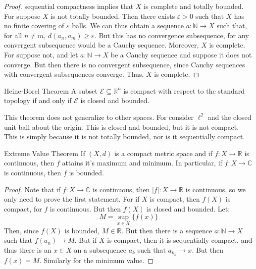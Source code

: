 \documentclass[crop=false,class=book,oneside]{standalone}
\begin{document}
\begin{proof}
                sequential compactness implies that $X$ is
                complete and totally bounded. For suppose $X$ is
                not totally bounded. Then there exists
                $\varepsilon>0$ such that $X$ has no finite
                covering of $\varepsilon$ balls. We can thus
                obtain a sequence $a:\mathbb{N}\rightarrow{X}$
                such that, for all $n\ne{m}$,
                $d(a_{n},a_{m})\geq\varepsilon$. But this
                has no convergence subsequence, for any convergent
                subsequence would be a Cauchy sequence. Moreover,
                $X$ is complete. For suppose not, and let
                $a:\mathbb{N}\rightarrow{X}$ be a Cauchy sequence
                and suppose it does not converge. But then there
                is no convergent subsequence, since Cauchy
                sequences with convergent subsequences converge.
                Thus, $X$ is complete.
            \end{proof}
            \begin{ltheorem}{Heine-Borel Theorem}
                A subset $\mathcal{E}\subseteq\mathbb{R}^{n}$ is
                compact with respect to the standard topology if and
                only if $\mathcal{E}$ is closed and bounded.
            \end{ltheorem}
            This theorem does not generalize to other spaces. For
            consider $\ell^{2}$ and the closed unit ball about the
            origin. This is closed and bounded, but it is not
            compact. This is simply because it is not totally
            bounded, nor is it sequentially compact.
            \begin{ltheorem}{Extreme Value Theorem}
                If $(X,d)$ is a compact metric space and if
                $f:X\rightarrow\mathbb{R}$ is continuous, then
                $f$ attains it's maximum and minimum. In particular,
                if $f:X\rightarrow\mathbb{C}$ is continuous, then
                $f$ is bounded.
            \end{ltheorem}
            \begin{proof}
                Note that if $f:X\rightarrow\mathbb{C}$ is
                continuous, then $|f|:X\rightarrow\mathbb{R}$ is
                continuous, so we only need to prove the first
                statement. For if $X$ is compact, then $f(X)$ is
                compact, for $f$ is continuous. But then $f(X)$
                is closed and bounded. Let:
                \begin{equation}
                    M=\underset{x\in{X}}\sup\{f(x)\}
                \end{equation}
                Then, since $f(X)$ is bounded, $M\in\mathbb{R}$.
                But then there is a sequence
                $a:\mathbb{N}\rightarrow{X}$ such that
                $f(a_{n})\rightarrow{M}$. But if $X$ is
                compact, then it is sequentially compact, and
                thus there is an $x\in{X}$ an a subsequence
                $a_{k}$ such that $a_{k_{n}}\rightarrow{x}$.
                But then $f(x)=M$. Similarly for the minimum value.
            \end{proof}
\end{document}
